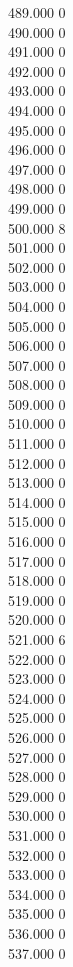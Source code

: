 { 489.000	0 \\
 490.000	0 \\
 491.000	0 \\
 492.000	0 \\
 493.000	0 \\
 494.000	0 \\
 495.000	0 \\
 496.000	0 \\
 497.000	0 \\
 498.000	0 \\
 499.000	0 \\
 500.000	8 \\
 501.000	0 \\
 502.000	0 \\
 503.000	0 \\
 504.000	0 \\
 505.000	0 \\
 506.000	0 \\
 507.000	0 \\
 508.000	0 \\
 509.000	0 \\
 510.000	0 \\
 511.000	0 \\
 512.000	0 \\
 513.000	0 \\
 514.000	0 \\
 515.000	0 \\
 516.000	0 \\
 517.000	0 \\
 518.000	0 \\
 519.000	0 \\
 520.000	0 \\
 521.000	6 \\
 522.000	0 \\
 523.000	0 \\
 524.000	0 \\
 525.000	0 \\
 526.000	0 \\
 527.000	0 \\
 528.000	0 \\
 529.000	0 \\
 530.000	0 \\
 531.000	0 \\
 532.000	0 \\
 533.000	0 \\
 534.000	0 \\
 535.000	0 \\
 536.000	0 \\
 537.000	0 \\
}
